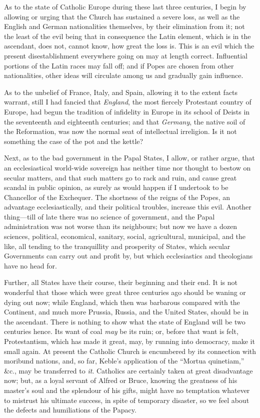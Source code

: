 As to the state of Catholic Europe during these
last three centuries, I begin by allowing or urging that the Church
has sustained a severe loss, as well as the English and German
nationalities themselves, by their elimination from it; not the least
of the evil being that in consequence the Latin element, which is in
the ascendant, does not, cannot know, how great the loss is. This is
an evil which the present disestablishment everywhere going on may at
length correct. Influential portions of the Latin races may fall off;
and if Popes are chosen from other nationalities, other ideas will
circulate among us and gradually gain influence.

As to the unbelief of France, Italy, and Spain,
allowing it to the extent facts warrant, still I had fancied that \emph{England},
the most fiercely Protestant country of Europe, had begun the
tradition of infidelity in Europe in its school of Deists in the
seventeenth and eighteenth centuries; and that \emph{Germany}, the
native soil of the Reformation, was now the normal seat of
intellectual irreligion. Is it not something the case of the pot and
the kettle?

Next, as to the bad government in the Papal
States, I allow, or rather argue, that an ecclesiastical
world-wide sovereign has neither time nor thought to bestow on secular
matters, and that such matters go to rack and ruin, and cause great
scandal in public opinion, as surely as would happen if I undertook to
be Chancellor of the Exchequer. The shortness of the reigns of the
Popes, an advantage ecclesiastically, and their political troubles,
increase this evil. Another thing—till of late there was no science
of government, and the Papal administration was not worse than its
neighbours; but now we have a dozen sciences, political, economical,
sanitary, social, agricultural, municipal, and the like, all tending
to the tranquillity and prosperity of States, which secular
Governments can carry out and profit by, but which ecclesiastics and
theologians have no head for.

Further, all States have their course, their
beginning and their end. It is not wonderful that those which were
great three centuries ago should be waning or dying out now; while
England, which then was barbarous compared with the Continent, and
much more Prussia, Russia, and the United States, should be in the
ascendant. There is nothing to show what the state of England will be
two centuries hence. Its want of coal \emph{may} be its ruin; or,
before that want is felt, Protestantism, which has made it great, may,
by running into democracy, make it small again. At present the
Catholic Church is encumbered by its connection with moribund nations,
and, so far, Keble's application of the ``Mortua quinetiam,'' \&c.,
may be transferred to \emph{it}. Catholics are certainly taken at
great disadvantage now; but, as a loyal servant of Alfred or Bruce,
knowing the greatness of his master's soul and the splendour of his
gifts, might have no temptation whatever to mistrust his ultimate
success, in spite of temporary disaster, so we feel about the defects
and humiliations of the Papacy.

